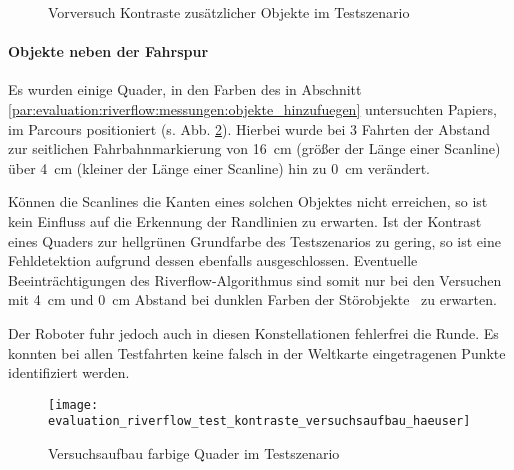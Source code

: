 \begin{figure}[htbp] %
{}
\hfill
{}
\hfill
{}
\hfill
{}
\label{fig:evaluation:riverflow:test_kontraste}
\caption{Vorversuch Kontraste zusätzlicher Objekte im Testszenario}
\end{figure}

\paragraph{Objekte neben der Fahrspur}
Es wurden einige Quader, in den Farben des in Abschnitt \ref{par:evaluation:riverflow:messungen:objekte_hinzufuegen} untersuchten Papiers, im Parcours positioniert (s. Abb. \ref{fig:evaluation:riverflow:test_kontraste_versuchsaufbau_haeuser}). Hierbei wurde bei 3 Fahrten der Abstand zur seitlichen Fahrbahnmarkierung von \SI{16}{cm} (größer der Länge einer Scanline) über \SI{4}{cm} (kleiner der Länge einer Scanline) hin zu \SI{0}{cm} verändert.

Können die Scanlines die Kanten eines solchen Objektes nicht erreichen, so ist kein Einfluss auf die Erkennung der Randlinien zu erwarten. Ist der Kontrast eines Quaders zur hellgrünen Grundfarbe des Testszenarios zu gering, so ist eine Fehldetektion aufgrund dessen ebenfalls ausgeschlossen. Eventuelle Beeinträchtigungen des Riverflow-Algorithmus sind somit nur bei den Versuchen mit \SI{4}{cm} und \SI{0}{cm} Abstand bei dunklen Farben der \glqq Störobjekte \grqq\ zu erwarten.

Der Roboter fuhr jedoch auch in diesen Konstellationen fehlerfrei die Runde. Es konnten bei allen Testfahrten keine falsch in der Weltkarte eingetragenen Punkte identifiziert werden.
 
\begin{figure}[htbp] %
\centering
\texttt{[image: evaluation\_riverflow\_test\_kontraste\_versuchsaufbau\_haeuser]}
\caption{Versuchsaufbau farbige Quader im Testszenario}
\label{fig:evaluation:riverflow:test_kontraste_versuchsaufbau_haeuser}
\end{figure}

